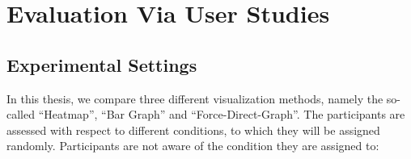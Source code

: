 
\chapter{Evaluation Via User Studies}
\label{ch:Evaluation}

\section{Experimental Settings}
\label{sec:Evaluation:ExperimentalSettings}
In this thesis, we compare three different visualization methods, namely the so-called “Heatmap”, “Bar Graph” and “Force-Direct-Graph”. The participants are assessed with respect to different conditions, to which they will be assigned randomly. Participants are not aware of the condition they are assigned to: 

